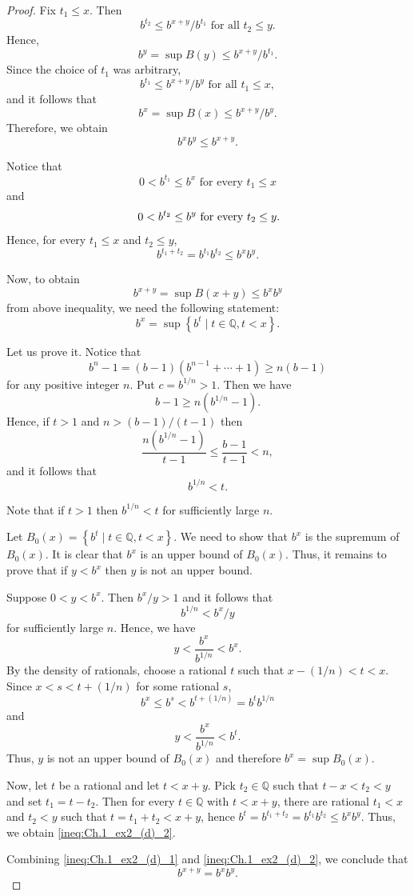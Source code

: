 \documentclass[11pt]{article}
\theoremstyle{definition}
\theoremstyle{plain}
\theoremstyle{remark}
\newcommand{\Q}{\mathbb{Q}}
\begin{document}
\begin{proof}
Fix $t_1\leq x$. Then 
\[
b^{t_2} \leq b^{x+y}/b^{t_1} \text{ for all } t_2 \leq y.
\]
Hence, 
\[
b^y = \sup B(y) \leq b^{x+y}/b^{t_1}.
\]
Since the choice of $t_1$ was arbitrary,
\[
b^{t_1} \leq b^{x+y}/b^y \text{ for all } t_1 \leq x,
\]
and it follows that
\[
b^x = \sup B(x) \leq b^{x+y}/b^y.
\]
Therefore, we obtain
\begin{equation} \label{ineq:Ch.1_ex2_(d)_1}
    b^xb^y \leq b^{x+y}.
\end{equation}

Notice that 
\[
0 < b^{t_1} \leq b^x \text{ for every } t_1 \leq x
\]
and 
\[
0 < b^{t_2} \leq b^y \text{ for every } t_2 \leq y \mathrlap{.}
\]
Hence, for every $t_1 \leq x$ and $t_2 \leq y$, 
\[
b^{t_1+t_2} = b^{t_1}b^{t_2} \leq b^xb^y.
\]

Now, to obtain
\begin{equation}\label{ineq:Ch.1_ex2_(d)_2}
b^{x+y} = \sup B(x+y) \leq b^xb^y
\end{equation}
from above inequality, we need the following statement:
\[
b^x=\sup \left\{b^t \mid t \in \Q, t<x\right\}.
\]

Let us prove it. Notice that
\[
b^n-1=(b-1)(b^{n-1}+ \cdots + 1) \geq n(b-1)
\]
for any positive integer $n$. Put $c=b^{1/n}>1$. Then we have
\[
b-1 \geq n(b^{1/n}-1).
\]
Hence, if $t>1$ and $n>(b-1)/(t-1)$ then
\[
\frac{n(b^{1/n}-1)}{t-1} \leq \frac{b-1}{t-1} < n,
\]
and it follows that
\[
b^{1/n}<t.
\]

Note that if $t>1$ then $b^{1/n}<t$ for sufficiently large $n$.

Let $B_0(x)=\left\{b^t \mid t \in \Q, t<x\right\}$.
We need to show that $b^x$ is the supremum of $B_0(x)$. 
It is clear that $b^x$ is an upper bound of $B_0(x)$.
Thus, it remains to prove that if $y<b^x$ then $y$ is not an upper bound.

Suppose $0<y<b^x$. Then $b^x/y >1$ and it follows that
\[
b^{1/n} <b^x/y
\]
for sufficiently large $n$. 
Hence, we have
\[
y<\frac{b^x}{b^{1/n}}<b^x.
\]
By the density of rationals, choose a rational $t$ such that $x-(1/n)<t<x$. 
Since $x<s<t+(1/n)$ for some rational $s$, 
\[
b^x \leq b^s <b^{t+(1/n)} = b^tb^{1/n}
\]
and
\[
y<\frac{b^x}{b^{1/n}}<b^t.
\]
Thus, $y$ is not an upper bound of $B_0(x)$ and therefore $b^x = \sup B_0(x)$.

Now, let $t$ be a rational and let $t<x+y$.
Pick $t_2 \in \Q$ such that $t-x<t_2<y$ and set $t_1=t-t_2$.
Then for every $t \in \Q$ with $t<x+y$, there are rational $t_1<x$ and $t_2<y$ such that $t=t_1+t_2<x+y$, hence $b^t=b^{t_1+t_2}=b^{t_1}b^{t_2} \leq b^xb^y$.
Thus, we obtain \eqref{ineq:Ch.1_ex2_(d)_2}.

Combining \eqref{ineq:Ch.1_ex2_(d)_1} and \eqref{ineq:Ch.1_ex2_(d)_2}, we conclude that
\[
b^{x+y}=b^xb^y.
\]
\end{proof}
\end{document}
